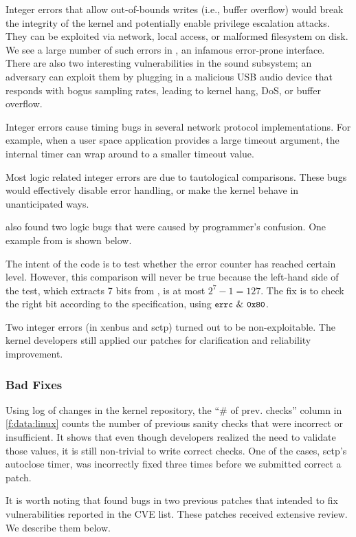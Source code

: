 Integer errors that allow out-of-bounds writes (i.e., buffer
overflow) would break the integrity of the kernel and potentially
enable privilege escalation attacks.  They can be exploited via network,
local access, or malformed filesystem on disk.  We see a large number of
such errors in , an infamous error-prone interface.
%
There are also two interesting vulnerabilities in the sound subsystem;
an adversary can exploit them by plugging in a malicious USB audio
device that responds with bogus sampling rates, leading to kernel
hang, DoS, or buffer overflow.

Integer errors cause timing bugs in several network protocol
implementations.  For example, when a user space application provides
a large timeout argument, the internal timer can wrap around
to a smaller timeout value.

Most logic related integer errors are due to tautological comparisons.
These bugs would effectively disable error handling, or make the kernel
behave in unanticipated ways. 

\sys also found two logic bugs that were caused by programmer's
confusion. One example from  is shown below.

The intent of the code is to test whether the error counter 
has reached certain level.  However, this
comparison will never be true because the left-hand side of the test,
which extracts 7 bits from , is at most
$2^7 - 1 = 127$.  The fix is to check the right bit according to the
specification, using $\cc{errc}\ \&\ \cc{0x80}$.

Two integer errors (in xenbus and sctp) turned out
to be non-exploitable.  The kernel developers still applied our
patches for clarification and reliability improvement.

\subsubsection{Bad Fixes}
\label{s:eval:bad}

Using log of changes in the kernel repository,
the ``\# of prev. checks'' column in \autoref{f:data:linux} counts
the number of previous sanity checks that were incorrect or insufficient.
It shows that even though developers realized the need to validate 
those values, it is still non-trivial to write correct checks.
One of the cases, sctp's autoclose timer, was incorrectly fixed
three times before we submitted correct a patch.

%
It is worth noting that \sys found bugs in two previous patches that
intended to fix vulnerabilities reported in the CVE list. 
These patches received extensive review. We describe them below.

